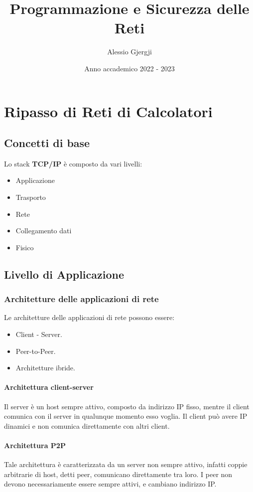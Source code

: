 \documentclass[oneside,a4paper,11pt]{book}
\title{Programmazione e Sicurezza delle Reti}
\author{Alessio Gjergji}
\date{Anno accademico 2022 - 2023}
\theoremstyle{italicstyle}
\theoremstyle{normStyle}
\begin{document}
\hypersetup{ %
    linktoc=all,     %
    linkcolor=black,  %
}
\maketitle
\tableofcontents
\chapter{Ripasso di Reti di Calcolatori}
\section{Concetti di base}
Lo stack \textbf{TCP/IP} è composto da vari livelli:
\begin{itemize}
  \item Applicazione
  \item Trasporto 
  \item Rete
  \item Collegamento dati 
  \item Fisico
\end{itemize}
\section{Livello di Applicazione}
\subsection{Architetture delle applicazioni di rete}
Le architetture delle applicazioni di rete possono essere:
\begin{itemize}
  \item Client - Server.
  \item Peer-to-Peer.
  \item Architetture ibride.
\end{itemize}
\subsubsection{Architettura client-server}
Il server è un host sempre attivo, composto da indirizzo IP fisso, mentre 
il client comunica con il server in qualunque momento esso voglia. Il client 
può avere IP dinamici e non comunica direttamente con altri client.
\subsubsection{Architettura P2P}
Tale architettura è caratterizzata da un server non sempre attivo, infatti 
coppie arbitrarie di host, detti peer, comunicano direttamente tra loro. I peer 
non devono necessariamente essere sempre attivi, e cambiano indirizzo IP.
\end{document}
